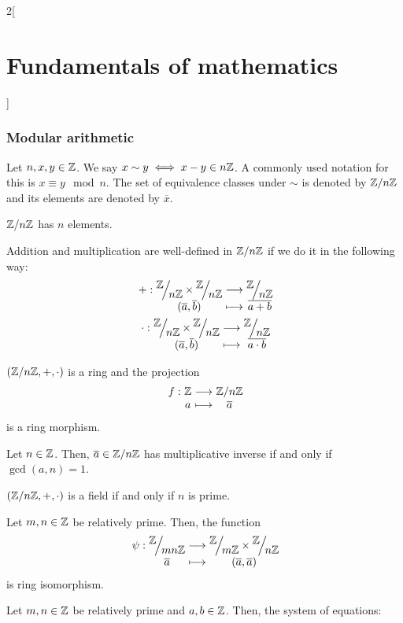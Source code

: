 \documentclass[../../../main.tex]{subfiles}
\begin{document}
\begin{multicols}{2}[\section{Fundamentals of mathematics}]
  \subsubsection{Modular arithmetic}
  \begin{definition}
    Let $n,x,y\in\mathbb{Z}$. We say $x\sim y\iff x-y\in n\mathbb{Z}$. A commonly used notation for this is $x\equiv y\mod n$. The set of equivalence classes under $\sim$ is denoted by $\quot{\ZZ}{n\ZZ}$ and its elements are denoted by $\overline{x}$.
  \end{definition}
  \begin{lemma}
    $\quot{\ZZ}{n\ZZ}$ has $n$ elements.
  \end{lemma}
  \begin{proposition}
    Addition and multiplication are well-defined in $\quot{\ZZ}{n\ZZ}$ if we do it in the following way:
    \begin{gather*}
      \function{+}{\displaystyle\quot{\ZZ}{n\ZZ}\times\quot{\ZZ}{n\ZZ}}{\displaystyle\quot{\ZZ}{n\ZZ}}{(\overline{a},\overline{b})}{\overline{a+b}}\\
      \function{\cdot}{\displaystyle\quot{\ZZ}{n\ZZ}\times\quot{\ZZ}{n\ZZ}}{\displaystyle\quot{\ZZ}{n\ZZ}}{(\overline{a},\overline{b})}{\overline{a\cdot b}}
    \end{gather*}
  \end{proposition}
  \begin{theorem}
    $(\quot{\ZZ}{n\ZZ},+,\cdot)$ is a ring and the projection
    $$\function{f}{\ZZ}{\quot{\ZZ}{n\ZZ}}{a}{\overline{a}}$$
    is a ring morphism.
  \end{theorem}
  \begin{lemma}
    Let $n\in\mathbb{Z}$. Then, $\overline{a}\in\quot{\ZZ}{n\ZZ}$ has multiplicative inverse if and only if $\gcd(a,n)=1$.
  \end{lemma}
  \begin{corollary}
    $(\quot{\ZZ}{n\ZZ},+,\cdot)$ is a field if and only if $n$ is prime.
  \end{corollary}
  \begin{theorem}
    Let $m,n\in\mathbb{Z}$ be relatively prime. Then, the function
    $$
      \function{\psi}{\displaystyle\quot{\ZZ}{mn\ZZ}}{\displaystyle\quot{\ZZ}{m\ZZ}\times\quot{\ZZ}{n\ZZ}}{\overline{a}}{(\overline{a},\overline{a})}\\
    $$
    is ring isomorphism.
  \end{theorem}
  \begin{corollary}
    Let $m,n\in\mathbb{Z}$ be relatively prime and $a,b\in\mathbb{Z}$. Then, the system of equations:

\end{corollary}
\end{multicols}
\end{document}

